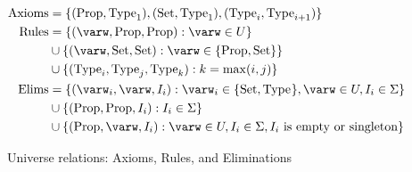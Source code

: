 \begin{figure}
\centering
\begin{align*}
\text{Axioms}
    &= \set{(\Prop, \Type{1}), (\Set, \Type{1}), (\Type{i}, \Type{i+1})} \\
\text{Rules}
    &= \set{(\varw, \Prop, \Prop) : \varw \in U} \\
    &\cup \set{(\varw, \Set, \Set) : \varw \in \set{\Prop, \Set}} \\
    &\cup \set{(\Type{i}, \Type{j}, \Type{k}) : k = \max(i, j)} \\
\text{Elims}
    &= \set{(\varw_i, \varw, I_i) : \varw_i \in \set{\Set, \Type{}}, \varw \in U, I_i \in \Sigma} \\
    &\cup \set{(\Prop, \Prop, I_i) : I_i \in \Sigma} \\
    &\cup \set{(\Prop, \varw, I_i) : \varw \in U, I_i \in \Sigma, \text{$I_i$ is empty or singleton}}
\end{align*}
\caption{Universe relations: Axioms, Rules, and Eliminations}
\label{fig:axruel}
\end{figure}